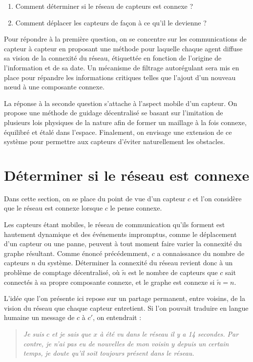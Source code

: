 \documentclass[10pt]{article}
\begin{document}
\begin{multicols}{2}
\begin{enumerate}
\item{Comment déterminer si le réseau de capteurs est connexe ?}
\item{Comment déplacer les capteurs de façon à ce qu'il le devienne ?}
\end{enumerate}

Pour répondre à la première question, on se concentre sur les
communications de capteur à capteur en proposant une méthode pour
laquelle chaque agent diffuse sa vision de la connexité du réseau,
étiquettée en fonction de l'origine de l'information et de sa date. Un
mécanisme de filtrage autorégulant sera mis en place pour répandre les
informations critiques telles que l'ajout d'un nouveau n\oe ud à une
composante connexe.

La réponse à la seconde question s'attache à l'aspect mobile d'un
capteur. On propose une méthode de guidage décentralisé se basant sur
l'imitation de plusieurs lois physiques de la nature afin de former un
maillage à la fois connexe, équilibré et étalé dans
l'espace. Finalement, on envisage une extension de ce système pour
permettre aux capteurs d'éviter naturellement les obstacles.

\section{Déterminer si le réseau est connexe}

Dans cette section, on se place du point de vue d'un capteur $c$ et
l'on considère que le réseau est connexe lorsque $c$ le pense connexe.

Les capteurs étant mobiles, le réseau de communication qu'ils forment
est hautement dynamique et des événements impromptus, comme le
déplacement d'un capteur ou une panne, peuvent à tout moment faire
varier la connexité du graphe résultant. Comme énoncé précédemment,
$c$ a connaissance du nombre de capteurs $n$ du système. Déterminer la
connexité du réseau revient donc à un problème de comptage
décentralisé, o\`u $\tilde{n}$ est le nombre de capteurs que $c$ sait
connectés à sa propre composante connexe, et le graphe est connexe si
$\tilde{n} = n$.

L'idée que l'on présente ici repose sur un partage permanent, entre
voisins, de la vision du réseau que chaque capteur entretient. Si l'on
pouvait traduire en langue humaine un message de $c$ à $c'$, on
entendrait :

\begin{quote}
  \textit{Je suis $c$ et je sais que $x$ à été vu dans le réseau il y
    a 14 secondes. Par contre, je n'ai pas eu de nouvelles de mon
    voisin $y$ depuis un certain temps, je doute qu'il soit toujours
    présent dans le réseau.}
\end{quote}


\end{multicols}
\end{document}
